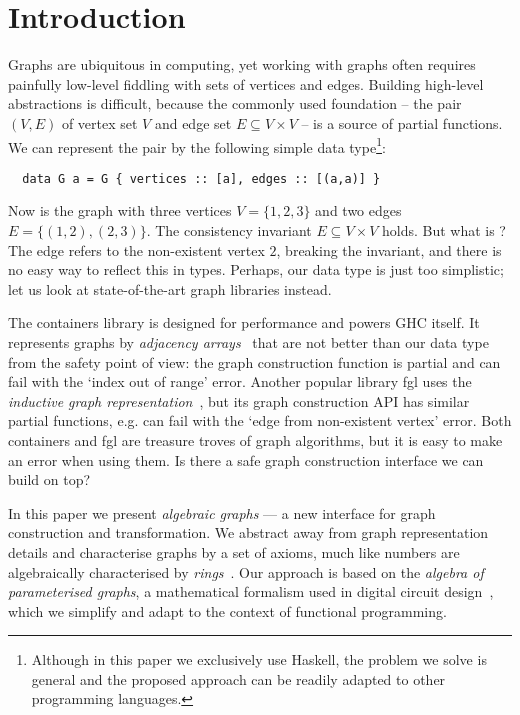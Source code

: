 \vspace{-2mm}
\section{Introduction}\label{sec-intro}

Graphs are ubiquitous in computing, yet working with graphs often requires
painfully low-level fiddling with sets of vertices and edges. Building high-level
abstractions is difficult, because the commonly used foundation -- the pair $(V, E)$
of vertex set $V$ and edge set $E \subseteq V \times V$ -- is a source of partial
functions. We can represent the pair by the following simple data type\footnote{Although
in this paper we exclusively use Haskell, the problem we solve is general and the
proposed approach can be readily adapted to other programming languages.}:

\vspace{0.5mm}
\begin{verbatim}
  data G a = G { vertices :: [a], edges :: [(a,a)] }
\end{verbatim}
\vspace{0.5mm}

\noindent
Now  is the graph with three vertices $V = \{1,2,3\}$ and
two edges $E = \{(1,2), (2,3)\}$. The consistency invariant $E \subseteq V \times V$ holds.
But what is ? The edge refers to the non-existent vertex $2$, breaking the
invariant, and there is no easy way to reflect this in types. Perhaps, our data type is just
too simplistic; let us look at state-of-the-art graph libraries instead.

The \textsf{containers} library is designed for performance and powers GHC itself. It
represents graphs by \emph{adjacency arrays}~\cite{1995_king_graphs} that are not
better than our data type from the safety point of view: the  graph construction
function is partial and can fail with the \textsf{`index out of range'} error.
Another popular library \textsf{fgl} uses the \emph{inductive graph
representation}~\cite{2001_erwig_inductive}, but its graph construction API has similar
partial functions, e.g.  can fail with the \textsf{`edge from non-existent
vertex'} error.
Both \textsf{containers} and \textsf{fgl} are treasure troves of graph algorithms,
but it is easy to make an error when using them. Is there a safe graph construction
interface we can build on top?

In this paper we present \emph{algebraic graphs} --- a new interface
for graph construction and transformation. We abstract away from graph representation
details and characterise graphs by a set of axioms, much like numbers are algebraically
characterised by \emph{rings}~\cite{1999_maclane_algebra}. Our approach is based on
the \emph{algebra of parameterised graphs}, a mathematical formalism used in digital
circuit design~\cite{2014_algebra_mokhov}, which we simplify and adapt to the context
of functional programming.

